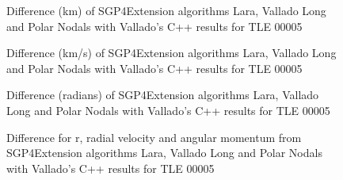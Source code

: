 \documentclass{article}
\begin{document}
\begin{figure}[htb]
  
  
  
\caption{Difference (km) of SGP4Extension algorithms Lara, Vallado Long and Polar Nodals with Vallado's C++ results for TLE 00005}
\label{fig:pos05}
\end{figure}


\begin{figure}[htb]
  
  
  
\caption{Difference (km/s) of SGP4Extension algorithms Lara, Vallado Long and Polar Nodals with Vallado's C++ results for TLE 00005}
\label{fig:vel05}
\end{figure}

\begin{figure}[htb]
  
  
  
\caption{Difference (radians) of SGP4Extension algorithms Lara, Vallado Long and Polar Nodals with Vallado's C++ results for TLE 00005}
\label{fig:arg05}
\end{figure}

\begin{figure}[htb]
  
  
  
\caption{Difference for r, radial velocity and angular momentum from SGP4Extension algorithms Lara, Vallado Long and Polar Nodals with Vallado's C++ results for TLE 00005}
\label{fig:rv05}
\end{figure}
\end{document}
